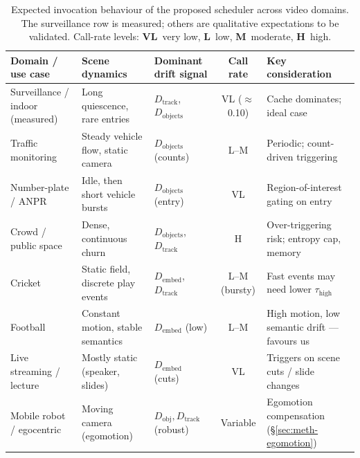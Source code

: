\begin{table}[htbp]
\centering
\caption[Cross-domain invocation patterns]{Expected invocation behaviour of the
proposed scheduler across video domains. The surveillance row is measured;
others are qualitative expectations to be validated. Call-rate levels:
\textbf{VL}~very low, \textbf{L}~low, \textbf{M}~moderate, \textbf{H}~high.}
\label{tab:domains}
\scriptsize
\begin{tabular}{@{}p{}p{}p{}cp{}@{}}
\toprule
\textbf{Domain / use case} & \textbf{Scene dynamics} & \textbf{Dominant drift signal} & \textbf{Call rate} & \textbf{Key consideration} \\
\midrule
Surveillance / indoor (measured) & Long quiescence, rare entries & $D_{\text{track}}$, $D_{\text{objects}}$ & VL ($\approx$0.10) & Cache dominates; ideal case \\
Traffic monitoring & Steady vehicle flow, static camera & $D_{\text{objects}}$ (counts) & L--M & Periodic; count-driven triggering \\
Number-plate / ANPR & Idle, then short vehicle bursts & $D_{\text{objects}}$ (entry) & VL & Region-of-interest gating on entry \\
Crowd / public space & Dense, continuous churn & $D_{\text{objects}}$, $D_{\text{track}}$ & H & Over-triggering risk; entropy cap, memory \\
Cricket & Static field, discrete play events & $D_{\text{embed}}$, $D_{\text{track}}$ & L--M (bursty) & Fast events may need lower $\tau_{\text{high}}$ \\
Football & Constant motion, stable semantics & $D_{\text{embed}}$ (low) & L--M & High motion, low semantic drift --- favours us \\
Live streaming / lecture & Mostly static (speaker, slides) & $D_{\text{embed}}$ (cuts) & VL & Triggers on scene cuts / slide changes \\
Mobile robot / egocentric & Moving camera (egomotion) & $D_{\text{obj}},D_{\text{track}}$ (robust) & Variable & Egomotion compensation (\S\ref{sec:meth-egomotion}) \\
\bottomrule
\end{tabular}
\end{table}

